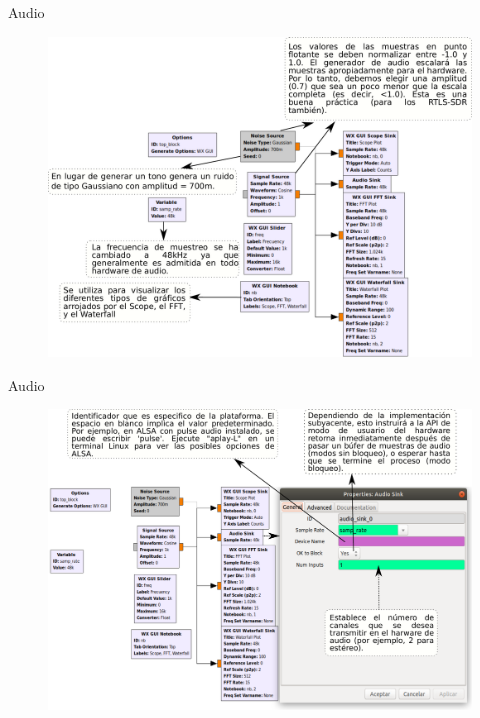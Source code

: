 \begin{frame}{Audio}

\begin{figure}

\begin{center}
\vspace{-2mm}
    \includegraphics[width=.85\textwidth]{lab3/pdf/lab3_2.pdf}
\end{center}
\end{figure}

\end{frame}

\begin{frame}{Audio}

\begin{figure}

\begin{center}
\vspace{-1mm}
\includegraphics[width=.92\textwidth]{lab3/pdf/lab3_3.pdf}
\end{center}
\end{figure}

\end{frame}

